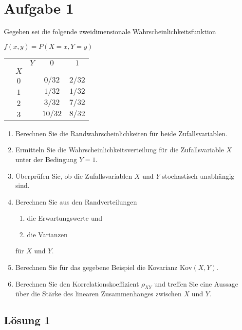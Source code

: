 \documentclass[main.tex]{subfiles}
\begin{document}
\section{Aufgabe 1}
Gegeben sei die folgende zweidimensionale Wahrscheinlichkeitsfunktion
\begin{center} $f(x,y)=P(X{=}x,Y{=}y)$ \end{center}
\begin{center}
\begin{tabular}{|lcr|c|c|}\hline
\quad &	& $Y$ & $0$ & $1$  \\
& $X$ & &         &        \\\hline
& $0$ &	& $0/32$  & $2/32$ \\\hline
& $1$ &	& $1/32$  & $1/32$ \\\hline
& $2$ &	& $3/32$  & $7/32$ \\\hline
& $3$ &	& $10/32$ &	$8/32$ \\\hline
\end{tabular}
\end{center}
\begin{enumerate}
\item	Berechnen Sie die Randwahrscheinlichkeiten für beide Zufallsvariablen.
\item	Ermitteln Sie die Wahrscheinlichkeitsverteilung für die Zufallsvariable $X$ unter der Bedingung $Y=1$.
\item	Überprüfen Sie, ob die Zufallsvariablen $X$ und $Y$ stochastisch unabhängig sind.
\item	Berechnen Sie aus den Randverteilungen
\begin{enumerate}
\item die Erwartungswerte und
\item die Varianzen
\end{enumerate}
für $X$ und $Y$.
\item	Berechnen Sie für das gegebene Beispiel die Kovarianz $\text{Kov}(X,Y)$.
\item	Berechnen Sie den Korrelationskoeffizient $\rho_{XY}$ und treffen Sie eine Aussage über die Stärke des linearen
Zusammenhanges zwischen $X$ und	$Y$.
\end{enumerate}

\subsection{Lösung 1}
\end{document}
